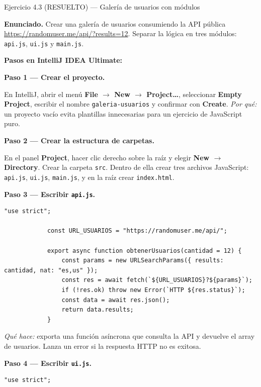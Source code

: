 \documentclass[11pt,a4paper,openany]{book}
\begin{document}
	\begin{cajaejercicio}{Ejercicio 4.3 (RESUELTO) --- Galería de usuarios con módulos}
		
		\textbf{Enunciado.} Crear una galería de usuarios consumiendo la
		API pública \url{https://randomuser.me/api/?results=12}. Separar
		la lógica en tres módulos: \texttt{api.js}, \texttt{ui.js} y
		\texttt{main.js}.
		
		\textbf{Pasos en IntelliJ IDEA Ultimate:}
		
		\bigskip
		\textbf{Paso 1 — Crear el proyecto.}
		
		En IntelliJ, abrir el menú \textbf{File $\rightarrow$ New $\rightarrow$
			Project\ldots}, seleccionar \textbf{Empty Project}, escribir el nombre
		\texttt{galeria-usuarios} y confirmar con \textbf{Create}.
		\emph{Por qué:} un proyecto vacío evita plantillas innecesarias para un
		ejercicio de JavaScript puro.
		
		\textbf{Paso 2 — Crear la estructura de carpetas.}
		
		En el panel \textbf{Project}, hacer clic derecho sobre la raíz y
		elegir \textbf{New $\rightarrow$ Directory}. Crear la carpeta
		\texttt{src}. Dentro de ella crear tres archivos JavaScript:
		\texttt{api.js}, \texttt{ui.js}, \texttt{main.js}, y en la raíz
		crear \texttt{index.html}.
		
		\textbf{Paso 3 — Escribir \texttt{api.js}.}
		
		\begin{lstlisting}[style=js,caption={src/api.js},label=lst:4.ej3.api]
			"use strict";
			
			const URL_USUARIOS = "https://randomuser.me/api/";
			
			export async function obtenerUsuarios(cantidad = 12) {
				const params = new URLSearchParams({ results: cantidad, nat: "es,us" });
				const res = await fetch(`${URL_USUARIOS}?${params}`);
				if (!res.ok) throw new Error(`HTTP ${res.status}`);
				const data = await res.json();
				return data.results;
			}
		\end{lstlisting}
		
		\emph{Qué hace:} exporta una función asíncrona que consulta la
		API y devuelve el array de usuarios. Lanza un error si la
		respuesta HTTP no es exitosa.
		
		\textbf{Paso 4 — Escribir \texttt{ui.js}.}
		
		\begin{lstlisting}[style=js,caption={src/ui.js},label=lst:4.ej3.ui]
			"use strict";
			

\end{lstlisting}
\end{cajaejercicio}
\end{document}
